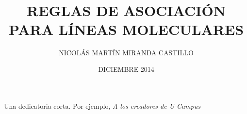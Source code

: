 \documentclass[upright, contnum]{umemoria}
\author{NICOL\'AS MART\'IN MIRANDA CASTILLO}
\title{REGLAS DE ASOCIACI\'ON PARA L\'INEAS MOLECULARES}
\date{DICIEMBRE 2014}
\begin{document}
\frontmatter
\maketitle

\begin{abstract}
\lipsum[1-4]
\end{abstract}

\begin{dedicatoria}
Una dedicatoria corta. Por ejemplo, \emph{A los creadores de U-Campus}
\end{dedicatoria}

\begin{thanks}
\lipsum[1-2]
\end{thanks}

\cleardoublepage
\begin{spacing}{1}
\tableofcontents
\listoffigures
\end{spacing}

\mainmatter








\nocite{*}


\end{document}
